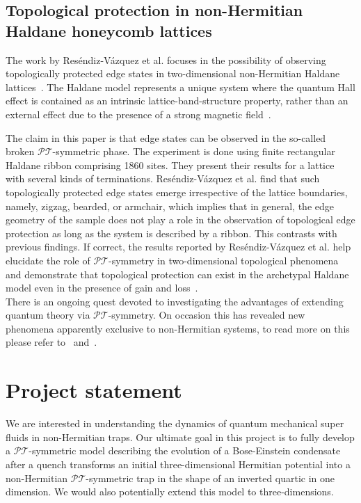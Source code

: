 \documentclass[12pt, a4paper]{report}
\newcommand\PT{\(\mathcal{PT}\)}
\begin{document}
\section{Topological protection in non-Hermitian Haldane honeycomb lattices}\label{TopoProtecc}
The work by Res\'endiz-V\'azquez et al. focuses in the possibility of observing topologically protected
edge states in two-dimensional non-Hermitian Haldane lattices~\cite{Tprotecc}.
The Haldane model represents a unique system where the quantum Hall effect is contained as an intrinsic lattice-band-structure property, rather than an external effect due to the presence of a strong magnetic field~\cite{QuantumAnomalousEffect}. 

The claim in this paper is that edge states can be observed in the so-called broken \PT-symmetric phase. 
The experiment is done using finite rectangular Haldane ribbon comprising 1860 sites. They present
their results for a lattice with several kinds of terminations. Res\'endiz-V\'azquez et al. find that such topologically protected edge states emerge irrespective of the lattice boundaries, namely, zigzag, bearded, or armchair, which implies that in general, the edge geometry of the sample does not play a role in the observation of topological edge protection as long as the system is described by a ribbon. This contrasts with previous findings. If correct, the results reported by Res\'endiz-V\'azquez et al. help elucidate the role of \PT-symmetry in two-dimensional topological phenomena and demonstrate that topological protection can exist in the archetypal Haldane model even in the presence of gain and loss~\cite{Tprotecc}.\\

There is an ongoing quest devoted to investigating the advantages of extending quantum theory via \PT-symmetry. On occasion this has revealed new phenomena apparently exclusive to non-Hermitian systems, to read more on this please refer to~\cite{EigenspaceEPs} and~\cite{NHQuantumHall}.

\chapter{Project statement}\label{MINE}
We are interested in understanding the dynamics of quantum mechanical super fluids in non-Hermitian traps. Our ultimate goal in this project is to fully develop a \PT-symmetric model describing the evolution of a Bose-Einstein condensate after a quench transforms an initial three-dimensional Hermitian potential into a non-Hermitian \PT-symmetric trap in the shape of an inverted quartic in one dimension. We would also potentially extend this model to three-dimensions. 
\end{document}
